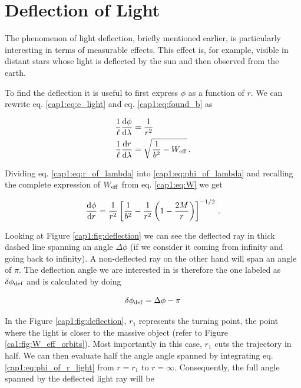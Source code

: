 

\section{Deflection of Light}

The phenomenon of light deflection, briefly mentioned earlier, is particularly
interesting in terms of measurable effects.
This effect is, for example, visible in distant stars whose light is deflected
by the sun and then observed from the earth.

To find the deflection it is useful to first express $\phi$ as a function of
$r$.
We can rewrite eq. \ref{cap1:eq:e_light} and eq. \ref{cap1:eq:found_b} as

\begin{subequations}
\begin{align}
    \frac{1}{\ell} \dv{\phi}{\lambda} &= \frac{1}{r^2}
    \label{cap1:eq:phi_of_lambda} \\
    \frac{1}{\ell} \dv{r}{\lambda} &= \sqrt{\frac{1}{b^2} - W_{\rm eff}}
    \label{cap1:eq:r_of_lambda} \, .
\end{align}
\end{subequations}

Dividing eq. \ref{cap1:eq:r_of_lambda} into \ref{cap1:eq:phi_of_lambda} and
recalling the complete expression of $W_{\rm eff}$ from eq. \ref{cap1:eq:W} we
get

\begin{equation}
    \dv{\phi}{r} = \frac{1}{r^2} \left[\frac{1}{b^2}
    - \frac{1}{r^2} \left(1 - \frac{2M}{r} \right) \right]^{-1/2} \, .
    \label{cap1:eq:phi_of_r_light}
\end{equation}

Looking at Figure \ref{cap1:fig:deflection} we can see the deflected ray in
thick dashed line spanning an angle $\Delta \phi$ (if we consider it coming from
infinity and going back to infinity).
A non-deflected ray on the other hand will span an angle of $\pi$.
The deflection angle we are interested in is therefore the one labeled as
$\delta \phi_{\rm def}$ and is calculated by doing

\begin{equation}
    \delta \phi_{\rm def} = \Delta \phi - \pi
    \label{cap1:eq:delta_Delta}
\end{equation}

In the Figure \ref{cap1:fig:deflection}, $r_1$ represents the turning point, the
point where the light is closer to the massive object (refer to Figure
\ref{ca1:fig:W_eff_orbits}).
Most importantly in this case, $r_1$ cuts the trajectory in half.
We can then evaluate half the angle angle spanned by integrating eq.
\ref{cap1:eq:phi_of_r_light} from $r = r_1$ to $r = \infty$.
Consequently, the full angle spanned by the deflected light ray will be

